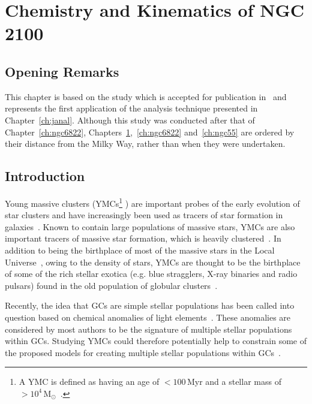 \chapter{Chemistry and Kinematics of NGC\,2100}
\label{ch:ngc2100}
\renewcommand{\headrulewidth}{1pt}

\section{Opening Remarks} %
\label{sec:opening_remarks}

This chapter is based on the study which is accepted for publication in~\cite{2016arXiv160202702P} and represents the first application of the analysis technique presented in Chapter~\ref{ch:janal}.
Although this study was conducted after that of Chapter~\ref{ch:ngc6822}, Chapters~\ref{ch:ngc2100},~\ref{ch:ngc6822} and~\ref{ch:ngc55} are ordered by their distance from the Milky Way, rather than when they were undertaken.


\section{Introduction} %
\label{sec:ngc2100intro}

Young massive clusters (YMCs\footnote{A YMC is defined as having an age of $<100\,$Myr and a stellar mass of $>10^{4}\,$M$_{\odot}$~\citep{2010ARA&A..48..431P}.}
) are important probes of the early evolution of star clusters and have increasingly been used as tracers of star formation in galaxies~\citep[e.g.][]{1995AJ....109..960W,1997AJ....114.2381M,1999AJ....118..752Z}.
Known to contain large populations of massive stars, YMCs are also important tracers of massive star formation, which is heavily clustered~\citep{2003ARA&A..41...57L,2005A&A...437..247D,2007MNRAS.380.1271P}.
In addition to being the birthplace of most of the massive stars in the Local Universe~\citep[$>200\,$M$_{\odot}$ stars in R136;][]{2010MNRAS.408..731C}, owing to the density of stars, YMCs are thought to be the birthplace of some of the rich stellar exotica
(e.g. blue stragglers, X-ray binaries and radio pulsars) found in the old population of globular clusters~\citep[GCs;][]{2010ARA&A..48..431P}.


Recently, the idea that GCs are simple stellar populations has been called into question based on chemical anomalies of light elements~\citep[C, N, O, Na and Al; e.g.][]{2012A&ARv..20...50G}.
These anomalies are considered by most authors to be the signature of multiple stellar populations within GCs.
Studying YMCs could therefore potentially help to constrain some of the proposed models for creating multiple stellar populations within GCs~\citep[e.g.][]{2014MNRAS.441.2754C}.

